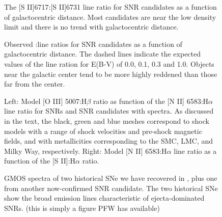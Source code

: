\begin{figure}
\caption{The [S II]6717:[S II]6731 line ratio for SNR candidates as a function of galactocentric distance.  Most candidates are near the low density limit and there is no trend with galactocentric distance.  \label{fig_s2_ratio}}
\end{figure}

\begin{figure}
\caption{Observed \hb:\ha line ratios for SNR candidates as a function of galactocentric distance. The dashed lines indicate the expected values of the line ration for E(B-V) of 0.0, 0.1, 0.3 and 1.0.  Objects near the galactic center tend to be more highly reddened than those far from the center. \label{fig_reddening}}
\end{figure}


\begin{figure}
\caption{Left: Model [O III] 5007:H$\beta$ ratio as function of the [N II] 6583:H$\alpha$ line ratio for SNRs and SNR candidates with spectra. As discussed in the text, the black, green and blue meshes correspond to shock models with a range of shock velocities and pre-shock magnetic fields, and with metallicities corresponding to the SMC, LMC, and Milky Way, respectively.  Right: Model [N II] 6583:H$\alpha$ line ratio as a function of  the [S II]:H$\alpha$ ratio. \label{fig_model}}
\end{figure}

\begin{figure}
\caption{GMOS spectra of two historical SNe we have recovered in \gal, plus one from another now-confirmed SNR candidate.  The two historical SNe show the broad emission lines characteristic of ejecta-dominated SNRs.  (this is simply a figure PFW has available) \label{historical_SNe}}
\end{figure}


\vspace{5mm}



